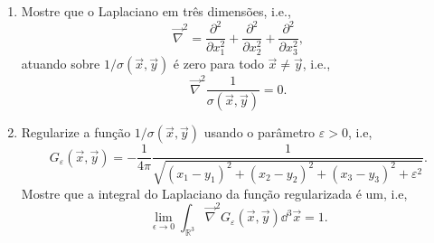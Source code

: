 \begin{enumerate}
\begin{enumerate}
		      \item Mostre que o Laplaciano em três dimensões, i.e.,
		            $$\vec\nabla^2 = \frac{\partial^2}{\partial x_1^2}+\frac{\partial^2}{\partial x_2^2}+\frac{\partial^2}{\partial x_3^2},$$
		            atuando sobre $1/\sigma(\vec{x},\vec{y})$ é zero para todo $\vec{x}\neq\vec{y}$, i.e.,
		            $$\vec\nabla^2\frac{1}{\sigma(\vec{x},\vec{y})} = 0.$$
		      \item Regularize a função $1/\sigma(\vec{x},\vec{y})$ usando
		            o parâmetro $\varepsilon>0$, i.e,
		            $$G_\varepsilon(\vec{x},\vec{y}) = -\frac{1}{4\pi}\frac{1}{\sqrt{(x_1-y_1)^2+(x_2-y_2)^2+(x_3-y_3)^2+\varepsilon^2}}.$$
		            Mostre que a integral do Laplaciano da função regularizada é um, i.e,
		            $$\lim_{\epsilon\to0}\int_{\mathbb{R}^3}\vec\nabla^2G_\varepsilon(\vec{x},\vec{y})\dd^3\vec{x} = 1.$$
	      \end{enumerate}
\end{enumerate}

